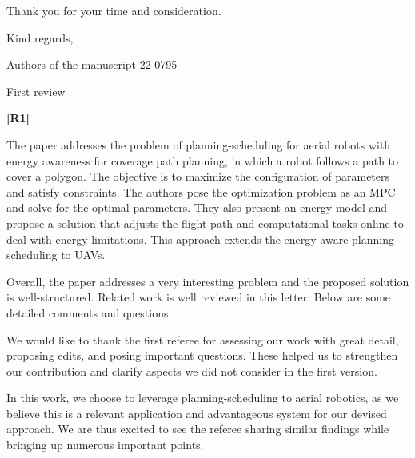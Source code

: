 \documentclass[10pt]{letter}
\begin{document}
Thank you for your time and consideration. 

\vspace{1em}


\noindent Kind regards, 

\begin{flushright}
Authors of the manuscript 22-0795\,\,\,\,\,\,\,\,\,\,\,\,\,\,\,\\
\end{flushright}

\vspace{5em}

\newpage 

{First review}

\vspace{3em}

{\hspace*{-4.5em}\textbf{[R1]}\vspace*{-1.9em}}

The paper addresses the problem of planning-scheduling for aerial robots with energy awareness for coverage path planning, in which a robot follows a path to cover a polygon. The objective is to maximize the configuration of parameters and satisfy constraints. The authors pose the optimization problem as an MPC and solve for the optimal parameters. They also present an energy model and propose a solution that adjusts the flight path and computational tasks online to deal with energy limitations. This approach extends the energy-aware planning-scheduling to UAVs.

Overall, the paper addresses a very interesting problem and the proposed solution is well-structured.
Related work is well reviewed in this letter. Below are some detailed comments and questions.

{\color{blue}

{\hspace*{-4.5em}{[R1]}\vspace*{-1.9em}}

We would like to thank the first referee for assessing our work with great detail, proposing edits, and posing important questions. These helped us to strengthen our contribution and clarify aspects we did not consider in the first version.

In this work, we choose to leverage planning-scheduling to aerial robotics, as we believe this is a relevant application and advantageous system for our devised approach. We are thus excited to see the referee sharing similar findings while bringing up numerous important points.}
\end{document}
